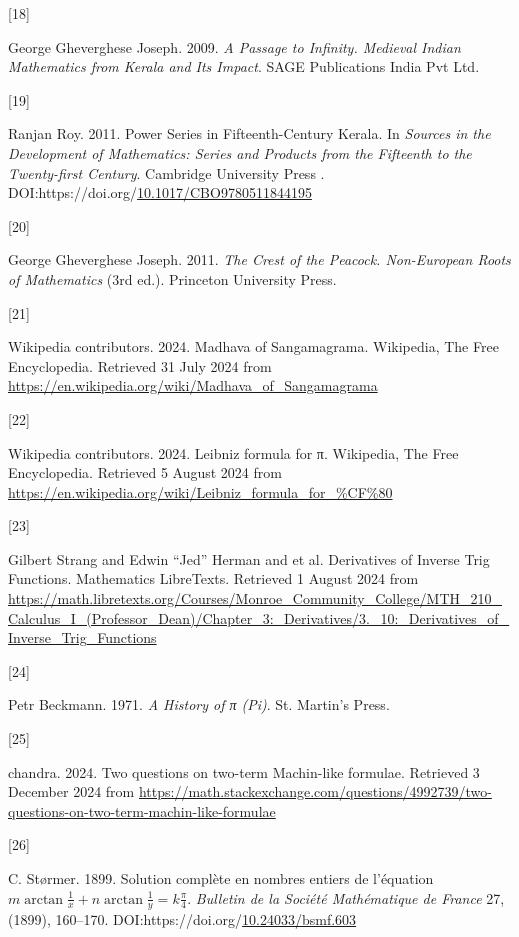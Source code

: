 \documentclass[
  a4paper,
]{article}
\newlength{\cslhangindent}
\newlength{\csllabelwidth}
\newenvironment{CSLReferences}[2] %
 {\begin{list}{}{%
  \setlength{\itemindent}{0pt}
  \setlength{\leftmargin}{0pt}
  \setlength{\parsep}{0pt}
  \ifodd #1
   \setlength{\leftmargin}{\cslhangindent}
   \setlength{\itemindent}{-1\cslhangindent}
  \fi
  \setlength{\itemsep}{#2\baselineskip}}}
 {\end{list}}
\newcommand{\CSLLeftMargin}[1]{\parbox[t]{\csllabelwidth}{\strut#1\strut}}
\newcommand{\CSLRightInline}[1]{\parbox[t]{\linewidth - \csllabelwidth}{\strut#1\strut}}
\begin{document}
\begin{CSLReferences}{0}{0}
\CSLLeftMargin{{[}18{]} }%
\CSLRightInline{George Gheverghese Joseph. 2009. \emph{{A Passage to
Infinity}. {Medieval Indian Mathematics from Kerala and Its Impact}}.
{SAGE Publications India Pvt Ltd}.}

\CSLLeftMargin{{[}19{]} }%
\CSLRightInline{Ranjan Roy. 2011. {Power Series in Fifteenth-Century
Kerala}. In \emph{{Sources in the Development of Mathematics}: {Series
and Products from the Fifteenth to the Twenty-first Century}}.
{Cambridge University Press }.
DOI:https://doi.org/\href{https://doi.org/10.1017/CBO9780511844195}{10.1017/CBO9780511844195}}

\CSLLeftMargin{{[}20{]} }%
\CSLRightInline{George Gheverghese Joseph. 2011. \emph{{The Crest of the
Peacock}. {Non-European Roots of Mathematics}} (3rd ed.). Princeton
University Press.}

\CSLLeftMargin{{[}21{]} }%
\CSLRightInline{Wikipedia contributors. 2024. {Madhava of Sangamagrama}.
{Wikipedia, The Free Encyclopedia}. Retrieved 31 July 2024 from
\url{https://en.wikipedia.org/wiki/Madhava_of_Sangamagrama}}

\CSLLeftMargin{{[}22{]} }%
\CSLRightInline{Wikipedia contributors. 2024. {Leibniz formula for π}.
{Wikipedia, The Free Encyclopedia}. Retrieved 5 August 2024 from
\url{https://en.wikipedia.org/wiki/Leibniz_formula_for_\%CF\%80}}

\CSLLeftMargin{{[}23{]} }%
\CSLRightInline{Gilbert Strang and Edwin ``Jed'' Herman and et al.
{Derivatives of Inverse Trig Functions}. Mathematics LibreTexts.
Retrieved 1 August 2024 from
\url{https://math.libretexts.org/Courses/Monroe_Community_College/MTH_210_Calculus_I_(Professor_Dean)/Chapter_3:_Derivatives/3._10:_Derivatives_of_Inverse_Trig_Functions}}

\CSLLeftMargin{{[}24{]} }%
\CSLRightInline{Petr Beckmann. 1971. \emph{{A History of π (Pi)}}. St.
Martin's Press.}

\CSLLeftMargin{{[}25{]} }%
\CSLRightInline{chandra. 2024. {Two questions on two-term Machin-like
formulae}. Retrieved 3 December 2024 from
\url{https://math.stackexchange.com/questions/4992739/two-questions-on-two-term-machin-like-formulae}}

\CSLLeftMargin{{[}26{]} }%
\CSLRightInline{C. Størmer. 1899. Solution complète en nombres entiers
de l{'}équation
\(m\arctan \frac{1}{x}+n\arctan \frac{1}{y}=k\frac{\pi }{4}\).
\emph{Bulletin de la Société Mathématique de France} 27, (1899),
160--170.
DOI:https://doi.org/\href{https://doi.org/10.24033/bsmf.603}{10.24033/bsmf.603}}


\end{CSLReferences}
\end{document}
